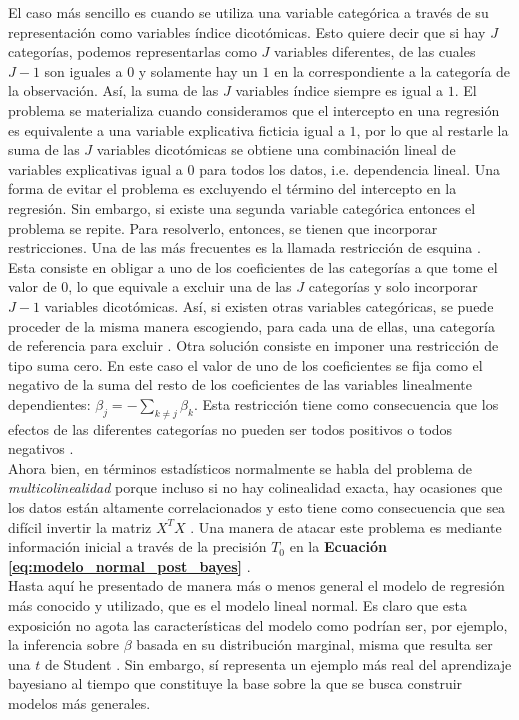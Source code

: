 El caso más sencillo es cuando se utiliza una variable categórica a través de su representación como variables índice dicotómicas. Esto quiere decir que si hay $J$ categorías, podemos representarlas como $J$ variables diferentes, de las cuales $J-1$ son iguales a $0$ y solamente hay un $1$ en la correspondiente a la categoría de la observación. Así, la suma de las $J$ variables índice siempre es igual a $1$. El problema se materializa cuando consideramos que el intercepto en una regresión es equivalente a una variable explicativa ficticia igual a $1$, por lo que al restarle la suma de las $J$ variables dicotómicas se obtiene una combinación lineal de variables explicativas igual a $0$ para todos los datos, i.e. dependencia lineal. Una forma de evitar el problema es excluyendo el término del intercepto en la regresión. Sin embargo, si existe una segunda variable categórica entonces el problema se repite. Para resolverlo, entonces, se tienen que incorporar restricciones. Una de las más frecuentes es la llamada restricción de esquina \parencite[63]{Regueiro12}. Esta consiste en obligar a uno de los coeficientes de las categorías a que tome el valor de $0$, lo que equivale a excluir una de las $J$ categorías y solo incorporar $J-1$ variables dicotómicas. Así, si existen otras variables categóricas, se puede proceder de la misma manera escogiendo, para cada una de ellas, una categoría de referencia para excluir \parencite[68]{GelmanHill06}. Otra solución consiste en imponer una restricción de tipo suma cero. En este caso el valor de uno de los coeficientes se fija como el negativo de la suma del resto de los coeficientes de las variables linealmente dependientes: $\beta_j=-\sum\limits_{k\neq j}\beta_k$. Esta restricción tiene como consecuencia que los efectos de las diferentes categorías no pueden ser todos positivos o todos negativos \parencite[62]{Usi14}.\\

Ahora bien, en términos estadísticos normalmente se habla del problema de \textit{multicolinealidad} porque incluso si no hay colinealidad exacta, hay ocasiones que los datos están altamente correlacionados y esto tiene como consecuencia que sea difícil invertir la matriz $X^TX$ \parencite[58]{Usi14}. Una manera de atacar este problema es mediante información inicial a través de la precisión $T_0$ en la \textbf{Ecuación \ref{eq:modelo_normal_post_bayes}} \parencite[112]{Congdon06}.\\ 

Hasta aquí he presentado de manera más o menos general el modelo de regresión más conocido y utilizado, que es el modelo lineal normal. Es claro que esta exposición no agota las características del modelo como podrían ser, por ejemplo, la inferencia sobre $\beta$ basada en su distribución marginal, misma que resulta ser una $t$ de Student \parencite[16]{GP98}. Sin embargo, sí representa un ejemplo más real del aprendizaje bayesiano al tiempo que constituye la base sobre la que se busca construir modelos más generales. 


